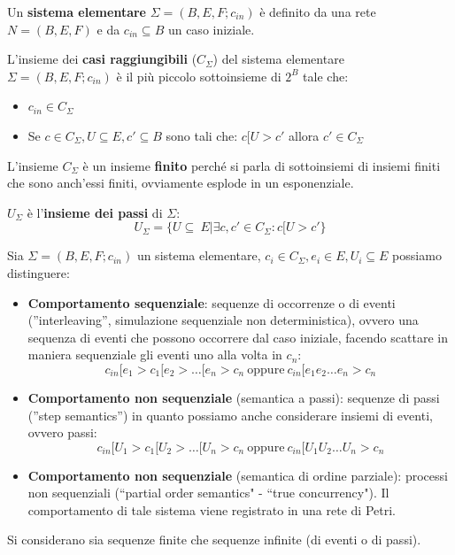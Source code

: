 Un \textbf{sistema elementare} $\Sigma = (B, E, F; c_{in})$ è definito da una rete
$N = (B, E, F)$ e da $c_{in} \subseteq B$ un caso iniziale.
\begin{definizione}
    L'insieme dei \textbf{casi raggiungibili} ($C_{\Sigma}$) del sistema elementare
    $\Sigma = (B, E, F; c_{in})$ è il più piccolo sottoinsieme di $2^B$ tale che:
    \begin{itemize}
        \item $c_{in} \in C_{\Sigma}$
        \item Se $c \in C_{\Sigma}, U \subseteq E, c' \subseteq B$ sono tali che:
              $c[U > c'$ allora $c' \in C_{\Sigma}$
    \end{itemize}
\end{definizione}
L'insieme $C_\Sigma$ è un insieme \textbf{finito} perché si parla di sottoinsiemi
di insiemi finiti che sono anch'essi finiti, ovviamente esplode in un esponenziale.
\begin{definizione}
    $U_{\Sigma}$ è l'\textbf{insieme dei passi} di $\Sigma$:
    \begin{equation}
        U_{\Sigma} = \{U \subseteq \ E | \exists c, c' \in C_{\Sigma}: c[U > c'\}
    \end{equation}
\end{definizione}
Sia $\Sigma = (B, E, F; c_{in})$ un sistema elementare,
$c_i \in C_{\Sigma}, e_i \in E, U_i \subseteq E$ possiamo distinguere:
\begin{itemize}
    \item \textbf{Comportamento sequenziale}: sequenze di occorrenze o di eventi
          (”interleaving”, simulazione sequenziale non deterministica), ovvero una
          sequenza di eventi che possono occorrere dal caso iniziale, facendo scattare
          in maniera sequenziale gli eventi uno alla volta in $c_n$:
          \begin{equation}
              c_{in}[e_1 > c_1[e_2 > \dots [e_n > c_n \ \text{oppure} \
              c_{in}[e_1e_2 \dots e_n > c_n
          \end{equation}
    \item \textbf{Comportamento non sequenziale} (semantica a passi): sequenze di
          passi (”step semantics”) in quanto possiamo anche considerare insiemi
          di eventi, ovvero passi:
          \begin{equation}
              c_{in}[U_1 > c_1[U_2 > \dots [U_n > c_n \ \text{oppure} \
              c_{in}[U_1U_2 \dots U_n > c_n
          \end{equation}
    \item \textbf{Comportamento non sequenziale}  (semantica di ordine parziale):
          processi non sequenziali (``partial order semantics" - ``true concurrency").
          Il comportamento di tale sistema viene registrato in una rete di Petri.
\end{itemize}
Si considerano sia sequenze finite che sequenze infinite (di eventi o di passi).

